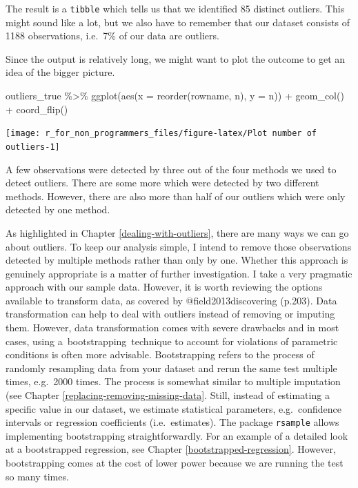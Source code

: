 \documentclass[
]{book}
\newenvironment{Shaded}{\begin{snugshade}}{\end{snugshade}}
\newcommand{\AttributeTok}[1]{\textcolor[rgb]{0.77,0.63,0.00}{#1}}
\newcommand{\FunctionTok}[1]{\textcolor[rgb]{0.00,0.00,0.00}{#1}}
\newcommand{\NormalTok}[1]{#1}
\newcommand{\SpecialCharTok}[1]{\textcolor[rgb]{0.00,0.00,0.00}{#1}}
\begin{document}
The result is a \texttt{tibble} which tells us that we identified 85 distinct outliers. This might sound like a lot, but we also have to remember that our dataset consists of 1188 observations, i.e.~7\% of our data are outliers.

Since the output is relatively long, we might want to plot the outcome to get an idea of the bigger picture.

\begin{Shaded}
\begin{Highlighting}[]
\NormalTok{outliers\_true }\SpecialCharTok{\%\textgreater{}\%}
  \FunctionTok{ggplot}\NormalTok{(}\FunctionTok{aes}\NormalTok{(}\AttributeTok{x =} \FunctionTok{reorder}\NormalTok{(rowname, n),}
             \AttributeTok{y =}\NormalTok{ n)) }\SpecialCharTok{+}
  \FunctionTok{geom\_col}\NormalTok{() }\SpecialCharTok{+}
  \FunctionTok{coord\_flip}\NormalTok{()}
\end{Highlighting}
\end{Shaded}

\begin{center}\texttt{[image: r\_for\_non\_programmers\_files/figure-latex/Plot number of outliers-1]} \end{center}

A few observations were detected by three out of the four methods we used to detect outliers. There are some more which were detected by two different methods. However, there are also more than half of our outliers which were only detected by one method.

As highlighted in Chapter \ref{dealing-with-outliers}, there are many ways we can go about outliers. To keep our analysis simple, I intend to remove those observations detected by multiple methods rather than only by one. Whether this approach is genuinely appropriate is a matter of further investigation. I take a very pragmatic approach with our sample data. However, it is worth reviewing the options available to transform data, as covered by @field2013discovering (p.203). Data transformation can help to deal with outliers instead of removing or imputing them. However, data transformation comes with severe drawbacks and in most cases, using a~bootstrapping~technique to account for violations of parametric conditions is often more advisable. Bootstrapping refers to the process of randomly resampling data from your dataset and rerun the same test multiple times, e.g.~2000 times. The process is somewhat similar to multiple imputation (see Chapter \ref{replacing-removing-missing-data}. Still, instead of estimating a specific value in our dataset, we estimate statistical parameters, e.g.~confidence intervals or regression coefficients (i.e.~estimates). The package \texttt{rsample} allows implementing bootstrapping straightforwardly. For an example of a detailed look at a bootstrapped regression, see Chapter \ref{bootstrapped-regression}. However, bootstrapping comes at the cost of lower power because we are running the test so many times.
\end{document}
